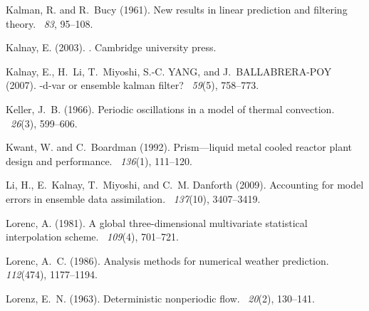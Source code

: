 \documentclass[12pt]{report}
\begin{document}
\begin{thebibliography}{}
Kalman, R. and R.~Bucy (1961).
\newblock New results in linear prediction and filtering theory.
~{\em 83}, 95--108.

Kalnay, E. (2003).
.
\newblock Cambridge university press.

Kalnay, E., H.~Li, T.~Miyoshi, S.-C. YANG, and J.~BALLABRERA-POY (2007).
-d-var or ensemble kalman filter?
~{\em 59\/}(5), 758--773.

Keller, J.~B. (1966).
\newblock Periodic oscillations in a model of thermal convection.
~{\em 26\/}(3), 599--606.

Kwant, W. and C.~Boardman (1992).
\newblock Prism—liquid metal cooled reactor plant design and performance.
~{\em 136\/}(1), 111--120.

Li, H., E.~Kalnay, T.~Miyoshi, and C.~M. Danforth (2009).
\newblock Accounting for model errors in ensemble data assimilation.
~{\em 137\/}(10), 3407--3419.

Lorenc, A. (1981).
\newblock A global three-dimensional multivariate statistical interpolation
  scheme.
~{\em 109\/}(4), 701--721.

Lorenc, A.~C. (1986).
\newblock Analysis methods for numerical weather prediction.
~{\em
  112\/}(474), 1177--1194.

Lorenz, E.~N. (1963).
\newblock Deterministic nonperiodic flow.
~{\em 20\/}(2), 130--141.


\end{thebibliography}
\end{document}
